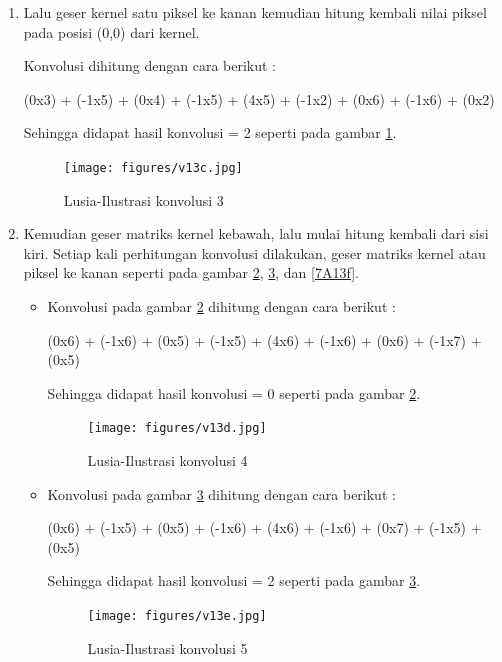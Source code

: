 \begin{enumerate}
\begin{enumerate}
	\item Lalu geser kernel satu piksel ke kanan kemudian hitung kembali  nilai piksel pada posisi (0,0) dari kernel.
	\par Konvolusi dihitung dengan cara berikut :
	\par (0x3) + (-1x5) + (0x4) + (-1x5) + (4x5) + (-1x2) + (0x6) + (-1x6) + (0x2)  
	\par Sehingga didapat hasil konvolusi = 2 seperti pada gambar \ref{7A13c}.
		\begin{figure}[!hbtp]
		\centering
		\texttt{[image: figures/v13c.jpg]}
		\caption{Lusia-Ilustrasi konvolusi 3}
		\label{7A13c}
		\end{figure}
		
	\item Kemudian geser matriks kernel kebawah, lalu mulai hitung kembali dari sisi kiri. Setiap kali perhitungan konvolusi dilakukan, geser matriks kernel atau piksel ke kanan seperti pada gambar \ref{7A13d}, \ref{7A13e}, dan \ref{7A13f}.
	\begin{itemize}
	\item Konvolusi pada gambar \ref{7A13d} dihitung dengan cara berikut :
	\par (0x6) + (-1x6) + (0x5) + (-1x5) + (4x6) + (-1x6) + (0x6) + (-1x7) + (0x5)   
	\par Sehingga didapat hasil konvolusi = 0 seperti pada gambar \ref{7A13d}.
		\begin{figure}[!hbtp]
		\centering
		\texttt{[image: figures/v13d.jpg]}
		\caption{Lusia-Ilustrasi konvolusi 4}
		\label{7A13d}
		\end{figure}
	\item Konvolusi pada gambar \ref{7A13e} dihitung dengan cara berikut :
	\par (0x6) + (-1x5) + (0x5) + (-1x6) + (4x6) + (-1x6) + (0x7) + (-1x5) + (0x5)   
	\par Sehingga didapat hasil konvolusi = 2 seperti pada gambar \ref{7A13e}.
		\begin{figure}[!hbtp]
		\centering
		\texttt{[image: figures/v13e.jpg]}
		\caption{Lusia-Ilustrasi konvolusi 5}
		\label{7A13e}
		\end{figure}
		

\end{itemize}
\end{enumerate}
\end{enumerate}
